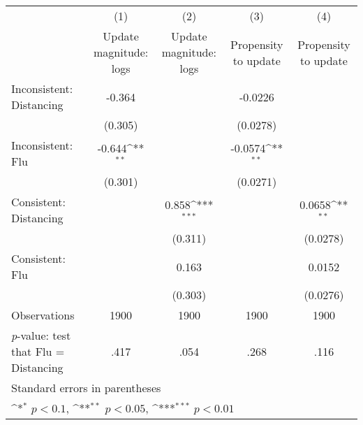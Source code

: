 {
\def\sym#1{\ifmmode^{#1}\else\(^{#1}\)\fi}
\begin{tabular}{l*{4}{c}}
\hline\hline
                    &\multicolumn{1}{c}{(1)}         &\multicolumn{1}{c}{(2)}         &\multicolumn{1}{c}{(3)}         &\multicolumn{1}{c}{(4)}         \\
                    &\shortstack{Update magnitude: \\ logs}         &\shortstack{Update magnitude: \\ logs}         &Propensity to update         &Propensity to update         \\
\hline
Inconsistent: Distancing&      -0.364         &                     &     -0.0226         &                     \\
                    &     (0.305)         &                     &    (0.0278)         &                     \\
[1em]
Inconsistent: Flu   &      -0.644\sym{**} &                     &     -0.0574\sym{**} &                     \\
                    &     (0.301)         &                     &    (0.0271)         &                     \\
[1em]
Consistent: Distancing&                     &       0.858\sym{***}&                     &      0.0658\sym{**} \\
                    &                     &     (0.311)         &                     &    (0.0278)         \\
[1em]
Consistent: Flu     &                     &       0.163         &                     &      0.0152         \\
                    &                     &     (0.303)         &                     &    (0.0276)         \\
\hline
Observations        &        1900         &        1900         &        1900         &        1900         \\
\textit{p}-value: test that Flu = Distancing&        .417         &        .054         &        .268         &        .116         \\
\hline\hline
\multicolumn{5}{l}{\footnotesize Standard errors in parentheses}\\
\multicolumn{5}{l}{\footnotesize \sym{*} \(p<0.1\), \sym{**} \(p<0.05\), \sym{***} \(p<0.01\)}\\
\end{tabular}
}
